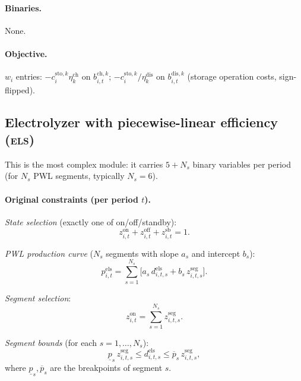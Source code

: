 \documentclass[11pt]{article}
\theoremstyle{definition}
\begin{document}
\paragraph{Binaries.} None.

\paragraph{Objective.}
$w_i$ entries: $-c^{\mathrm{sto},k}_i\eta^{\mathrm{ch}}_k$ on
$b^{\mathrm{ch},k}_{i,t}$;
$-c^{\mathrm{sto},k}_i/\eta^{\mathrm{dis}}_k$ on
$b^{\mathrm{dis},k}_{i,t}$ (storage operation costs, sign-flipped).

\subsection{Electrolyzer with piecewise-linear efficiency (\textsc{els})}
\label{sec:els}

This is the most complex module: it carries $5+N_s$ binary variables per
period (for $N_s$ PWL segments, typically $N_s=6$).

\paragraph{Original constraints (per period $t$).}

\emph{State selection} (exactly one of on/off/standby):
\begin{equation}
z^{\mathrm{on}}_{i,t}+z^{\mathrm{off}}_{i,t}+z^{\mathrm{sb}}_{i,t}=1.
\label{eq:els-state}
\end{equation}

\emph{PWL production curve} ($N_s$ segments with slope $a_s$ and
intercept $b_s$):
\begin{equation}
p^{\mathrm{els}}_{i,t}=\sum_{s=1}^{N_s}\bigl[
  a_s\,d^{\mathrm{els}}_{i,t,s}+b_s\,z^{\mathrm{seg}}_{i,t,s}\bigr].
\label{eq:els-production}
\end{equation}

\emph{Segment selection}:
\begin{equation}
z^{\mathrm{on}}_{i,t}=\sum_{s=1}^{N_s}z^{\mathrm{seg}}_{i,t,s}.
\label{eq:els-seg-sel}
\end{equation}

\emph{Segment bounds} (for each $s=1,\dots,N_s$):
\begin{equation}
\underline{p}_s\,z^{\mathrm{seg}}_{i,t,s}
  \le d^{\mathrm{els}}_{i,t,s}
  \le\overline{p}_s\,z^{\mathrm{seg}}_{i,t,s},
\label{eq:els-seg-bounds}
\end{equation}
where $\underline{p}_s,\overline{p}_s$ are the breakpoints of segment $s$.
\end{document}
